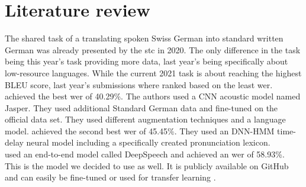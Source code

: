\section{Literature review}
The shared task of a translating spoken Swiss German into standard written German was already presented by the \gls{stc} in 2020. The only difference in the task being this year's task providing more data, last year's being specifically about low-resource languages. While the current 2021 task is about reaching the highest BLEU score, last year's submissions where ranked based on the least \gls{wer}. \citet{buechi2020} achieved the best \gls{wer} of 40.29\%. The authors used a CNN acoustic model named Jasper. They used additional Standard German data and fine-tuned on the official data set. They used different augmentation techniques and a language model.  \cite{Kew2020} achieved the second best \gls{wer} of 45.45\%. They used an DNN-HMM time-delay neural model including a specifically created pronunciation lexicon.   \\
\citet{agarwal2020} used an end-to-end model called DeepSpeech and achieved an \gls{wer} of 58.93\%. This is the model we decided to use as well. It is publicly available on GitHub and can easily be fine-tuned or used for transfer learning \citet{pluss2020}.
